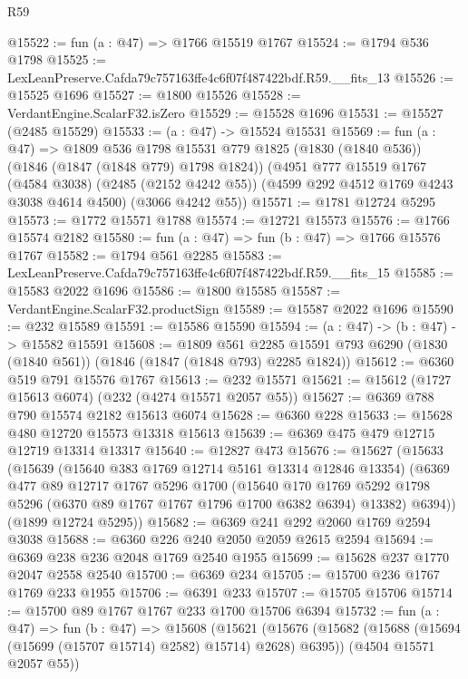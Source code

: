 \begin{lexlean}{R59}
\begin{coremodule}
@15522 := fun (a : @47) => @1766 @15519 @1767
@15524 := @1794 @536 @1798
@15525 := LexLeanPreserve.Cafda79c757163ffe4c6f07f487422bdf.R59.__fits_13
@15526 := @15525 @1696
@15527 := @1800 @15526
@15528 := VerdantEngine.ScalarF32.isZero
@15529 := @15528 @1696
@15531 := @15527 (@2485 @15529)
@15533 := (a : @47) -> @15524 @15531
@15569 := fun (a : @47) =>
  @1809
    @536
    @1798
    @15531
    @779
    @1825
    (@1830 (@1840 @536))
    (@1846 (@1847 (@1848 @779) @1798 @1824))
    (@4951
      @777
      @15519
      @1767
      (@4584 @3038)
      (@2485 (@2152 @4242 @55))
      (@4599 @292 @4512 @1769 @4243 @3038 @4614 @4500)
      (@3066 @4242 @55))
@15571 := @1781 @12724 @5295
@15573 := @1772 @15571 @1788
@15574 := @12721 @15573
@15576 := @1766 @15574 @2182
@15580 := fun (a : @47) => fun (b : @47) => @1766 @15576 @1767
@15582 := @1794 @561 @2285
@15583 := LexLeanPreserve.Cafda79c757163ffe4c6f07f487422bdf.R59.__fits_15
@15585 := @15583 @2022 @1696
@15586 := @1800 @15585
@15587 := VerdantEngine.ScalarF32.productSign
@15589 := @15587 @2022 @1696
@15590 := @232 @15589
@15591 := @15586 @15590
@15594 := (a : @47) -> (b : @47) -> @15582 @15591
@15608 := @1809
    @561
    @2285
    @15591
    @793
    @6290
    (@1830 (@1840 @561))
    (@1846 (@1847 (@1848 @793) @2285 @1824))
@15612 := @6360 @519 @791 @15576 @1767
@15613 := @232 @15571
@15621 := @15612 (@1727 @15613 @6074) (@232 (@4274 @15571 @2057 @55))
@15627 := @6369 @788 @790 @15574 @2182 @15613 @6074
@15628 := @6360 @228
@15633 := @15628 @480 @12720 @15573 @13318 @15613
@15639 := @6369 @475 @479 @12715 @12719 @13314 @13317
@15640 := @12827 @473
@15676 := @15627
    (@15633
      (@15639
        (@15640 @383 @1769 @12714 @5161 @13314 @12846 @13354)
        (@6369
          @477
          @89
          @12717
          @1767
          @5296
          @1700
          (@15640
            @170
            @1769
            @5292
            @1798
            @5296
            (@6370 @89 @1767 @1767 @1796 @1700 @6382 @6394)
            @13382)
          @6394))
      (@1899 @12724 @5295))
@15682 := @6369 @241 @292 @2060 @1769 @2594 @3038
@15688 := @6360 @226 @240 @2050 @2059 @2615 @2594
@15694 := @6369 @238 @236 @2048 @1769 @2540 @1955
@15699 := @15628 @237 @1770 @2047 @2558 @2540
@15700 := @6369 @234
@15705 := @15700 @236 @1767 @1769 @233 @1955
@15706 := @6391 @233
@15707 := @15705 @15706
@15714 := @15700 @89 @1767 @1767 @233 @1700 @15706 @6394
@15732 := fun (a : @47) =>
  fun (b : @47) =>
  @15608
    (@15621
      (@15676 (@15682 (@15688 (@15694 (@15699 (@15707 @15714) @2582) @15714) @2628) @6395))
      (@4504 @15571 @2057 @55))

\end{coremodule}
\end{lexlean}
